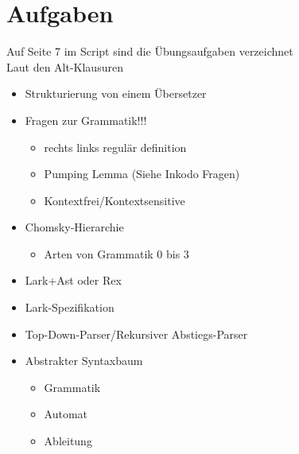 \section{Aufgaben}
Auf Seite 7 im Script sind die Übungsaufgaben verzeichnet\\
Laut den Alt-Klausuren
\begin{itemize}
  \item Strukturierung von einem Übersetzer
  \item Fragen zur Grammatik!!!
  \begin{itemize}
    \item []  rechts links regulär definition
    \item []  Pumping Lemma (Siehe Inkodo Fragen)
    \item []  Kontextfrei/Kontextsensitive
  \end{itemize}
  \item Chomsky-Hierarchie
  \begin{itemize}
    \item []  Arten von Grammatik 0 bis 3
  \end{itemize}
  \item Lark+Ast oder Rex
  \item Lark-Spezifikation
  \item Top-Down-Parser/Rekursiver Abstiegs-Parser
  \item Abstrakter Syntaxbaum
  \begin{itemize}
    \item Grammatik 
    \item Automat
    \item Ableitung
  \end{itemize}
\end{itemize}

